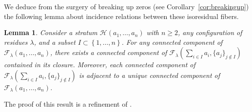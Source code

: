\documentclass[11pt]{article}
\newtheorem{lem}[thm]{Lemma}
\theoremstyle{definition}
\begin{document}
We deduce from the surgery of breaking up zeros (see Corollary~\ref{cor:breakingup}) the following lemma about incidence relations between these isoresidual fibers.

\begin{lem}\label{lem:incidence}
Consider a stratum $\mathcal{H}(a_{1},\dots,a_{n})$ with $n \geq 2$, any configuration of residues $\lambda$, and a subset $I\subset \left\{1,\dots,n\right\}$. For any connected component of $\mathcal{F}_{\lambda}(a_{1},\dots,a_{n})$, there exists a connected component of $\mathcal{F}_{\lambda}(\sum_{i\in I} a_{i},\lbrace a_{j}\rbrace_{j\notin I})$ contained in its closure. Moreover, each connected component of $\mathcal{F}_{\lambda}(\sum_{i\in I} a_{i},\lbrace a_{j}\rbrace_{j\notin I})$ is adjacent to a unique connected component of $\mathcal{F}_{\lambda}(a_{1},\dots,a_{n})$.
\end{lem}

The proof of this result is a refinement of \cite[Prop.\,7.1 \&~7.2]{Bo}.
\end{document}
